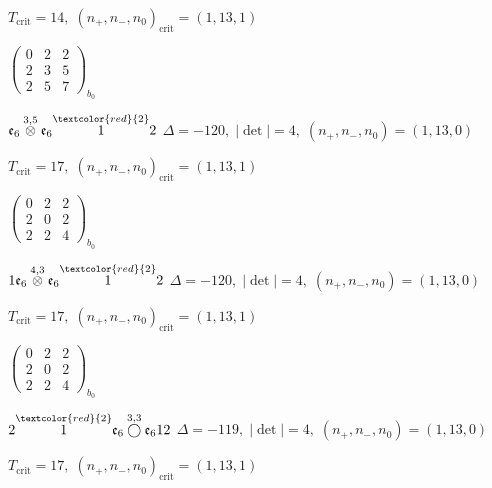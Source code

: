\documentclass[10pt]{article}
\begin{document}
\hspace{1em}$T_{\text{crit}}=14,\; (n_+,n_-,n_0)_{\text{crit}}=(1,13,1)$

\hspace{2em}$\left(\begin{smallmatrix}0 & 2 & 2 \\ 2 & 3 & 5 \\ 2 & 5 & 7\end{smallmatrix}\right)_{\!b_0}$

\smallskip

$\mathfrak{e}_6\overset{3,5}{\otimes}\mathfrak{e}_6\overset{\textcolor{red}{2}}{1}2$ \quad $\Delta=-120,\; |\det|=4,\; (n_+,n_-,n_0)=(1,13,0)$

\hspace{1em}$T_{\text{crit}}=17,\; (n_+,n_-,n_0)_{\text{crit}}=(1,13,1)$

\hspace{2em}$\left(\begin{smallmatrix}0 & 2 & 2 \\ 2 & 0 & 2 \\ 2 & 2 & 4\end{smallmatrix}\right)_{\!b_0}$

\smallskip

$1\mathfrak{e}_6\overset{4,3}{\otimes}\mathfrak{e}_6\overset{\textcolor{red}{2}}{1}2$ \quad $\Delta=-120,\; |\det|=4,\; (n_+,n_-,n_0)=(1,13,0)$

\hspace{1em}$T_{\text{crit}}=17,\; (n_+,n_-,n_0)_{\text{crit}}=(1,13,1)$

\hspace{2em}$\left(\begin{smallmatrix}0 & 2 & 2 \\ 2 & 0 & 2 \\ 2 & 2 & 4\end{smallmatrix}\right)_{\!b_0}$

\smallskip

$2\overset{\textcolor{red}{2}}{1}\mathfrak{e}_6\overset{3,3}{\bigcirc}\mathfrak{e}_612$ \quad $\Delta=-119,\; |\det|=4,\; (n_+,n_-,n_0)=(1,13,0)$

\hspace{1em}$T_{\text{crit}}=17,\; (n_+,n_-,n_0)_{\text{crit}}=(1,13,1)$
\end{document}
